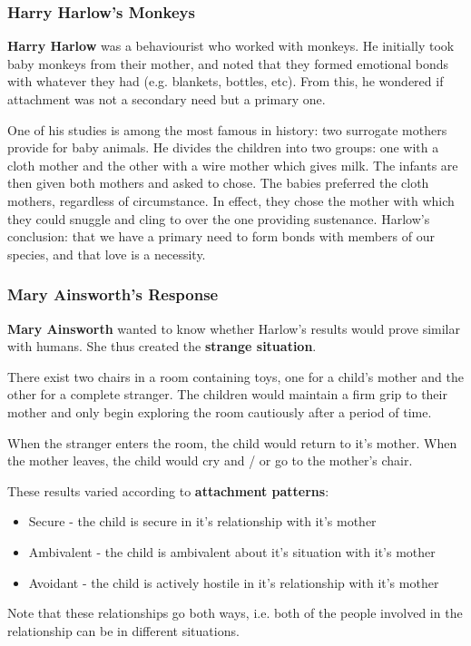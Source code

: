 \documentclass[12pt]{article}
\begin{document}
\subsubsection*{Harry Harlow's Monkeys}
{\bf Harry Harlow} was a behaviourist who worked with monkeys. He initially took baby monkeys from their mother, and noted that they formed emotional bonds with whatever they had (e.g. blankets, bottles, etc). From this, he wondered if attachment was not a secondary need but a primary one.

One of his studies is among the most famous in history: two surrogate mothers provide for baby animals. He divides the children into two groups: one with a cloth mother and the other with a wire mother which gives milk. The infants are then given both mothers and asked to chose. The babies preferred the cloth mothers, regardless of circumstance. In effect, they chose the mother with which they could snuggle and cling to over the one providing sustenance. Harlow's conclusion: that we have a primary need to form bonds with members of our species, and that love is a necessity.

\subsubsection*{Mary Ainsworth's Response}
{\bf Mary Ainsworth} wanted to know whether Harlow's results would prove similar with humans. She thus created the {\bf strange situation}.

There exist two chairs in a room containing toys, one for a child's mother and the other for a complete stranger. The children would maintain a firm grip to their mother and only begin exploring the room cautiously after a period of time.

When the stranger enters the room, the child would return to it's mother. When the mother leaves, the child would cry and / or go to the mother's chair.

These results varied according to {\bf attachment patterns}:
\begin{itemize}
\item Secure - the child is secure in it's relationship with it's mother
\item Ambivalent - the child is ambivalent about it's situation with it's mother
\item Avoidant - the child is actively hostile in it's relationship with it's mother
\end{itemize}

Note that these relationships go both ways, i.e. both of the people involved in the relationship can be in different situations.
\end{document}
